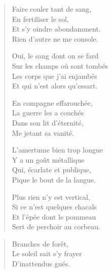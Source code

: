 \begin{verse}
Faire couler tant de sang,\\
En fertiliser le sol,\\
Et s’y oindre abondamment.\\
Rien d’autre ne me console.

Oui, le sang dont on se fard\\
Sur les champs où sont tombés\\
Les corps que j’ai enjambés\\
Et qui n’est alors qu’essart.

En compagne effarouchée,\\
La guerre les a couchés\\
Dans son lit d’éternité,\\
Me jetant sa vanité.

L’amertume bien trop longue\\
Y a un goût métallique\\
Qui, écarlate et publique,\\
Pique le bout de la langue.

Plus rien n’y est vertical,\\
Si ce n’est quelques chacals\\
Et l’épée dont le pommeau\\
Sert de perchoir au corbeau.
\end{verse}

\begin{verse}
Branches de forêt,\\
Le soleil sait s’y frayer\\
D’inattendus gués.
\end{verse}

